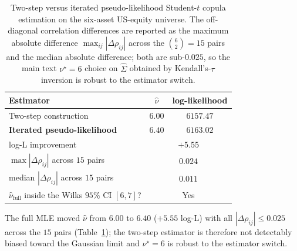 \begin{table}[!ht]
\centering
\small
\caption{Two-step versus iterated pseudo-likelihood Student-$t$ copula estimation on the six-asset US-equity universe. The off-diagonal correlation differences are reported as the maximum absolute difference $\max_{ij} |\Delta \rho_{ij}|$ across the $\binom{6}{2} = 15$ pairs and the median absolute difference; both are sub-$0.025$, so the main text $\nu^\star = 6$ choice on $\hat\Sigma$ obtained by Kendall's-$\tau$ inversion is robust to the estimator switch.}
\label{tab:full_tcopula_mle}
\begin{tabular}{l c c}
\toprule
Estimator & $\hat\nu$ & log-likelihood \\
\midrule
Two-step construction & $6.00$ & $6157.47$ \\
\textbf{Iterated pseudo-likelihood}   & $\mathbf{6.40}$ & $\mathbf{6163.02}$ \\
\midrule
log-L improvement   & \multicolumn{2}{c}{$+5.55$} \\
$\max |\Delta \rho_{ij}|$ across $15$ pairs & \multicolumn{2}{c}{$0.024$} \\
median $|\Delta \rho_{ij}|$ across $15$ pairs & \multicolumn{2}{c}{$0.011$} \\
$\hat\nu_{\text{full}}$ inside the Wilks $95\%$ CI $[6, 7]$? & \multicolumn{2}{c}{Yes} \\
\bottomrule
\end{tabular}
\end{table}

The full MLE moved $\hat\nu$ from $6.00$ to $6.40$ ($+5.55$ log-L) with all $|\Delta \rho_{ij}| \le 0.025$ across the $15$ pairs (Table~\ref{tab:full_tcopula_mle}); the two-step estimator is therefore not detectably biased toward the Gaussian limit and $\nu^\star = 6$ is robust to the estimator switch.
